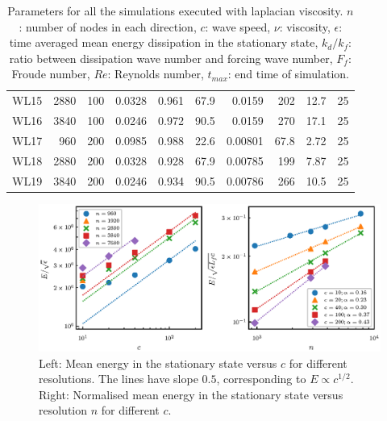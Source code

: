 \begin{table}
\begin{center}
\begin{tabular}{lrrrrrrrrr}
WL15 &  2880 &  100 &   0.0328 &       0.961 &                    67.9 &  0.0159 &   202 &           12.7 &          25 \\
WL16 &  3840 &  100 &   0.0246 &       0.972 &                    90.5 &  0.0159 &   270 &           17.1 &          25 \\
WL17 &   960 &  200 &   0.0985 &       0.988 &                    22.6 & 0.00801 &  67.8 &           2.72 &          25 \\
WL18 &  2880 &  200 &   0.0328 &       0.928 &                    67.9 & 0.00785 &   199 &           7.87 &          25 \\
WL19 &  3840 &  200 &   0.0246 &       0.934 &                    90.5 & 0.00786 &   266 &           10.5 &          25 \\
\bottomrule
\end{tabular}


\label{Table2}



\caption{Parameters for all the simulations executed with laplacian viscosity.
$ n $: number of nodes in each direction, $ c $: wave speed, $ \nu  $:  viscosity, $ \epsilon $: time
averaged mean energy dissipation in the stationary state, $ k_{d}/ k_f $: ratio
between dissipation wave number and forcing wave number, $F_f $: Froude
number, $Re$: Reynolds number, $ t_{max} $: end time of simulation.}
\end{center}
\end{table}

\begin{figure}
\centerline{\includegraphics[]{paper_04_shallow_water/Pyfig/fig12}}
\caption{Left: Mean energy in the stationary state versus $ c $ for different
resolutions. The lines have slope $ 0.5 $, corresponding to $ E \propto c^{1/2}
$. Right: Normalised mean energy in the stationary state versus resolution $ n
$ for different $ c $.}
\label{MeanE2}
\end{figure}

